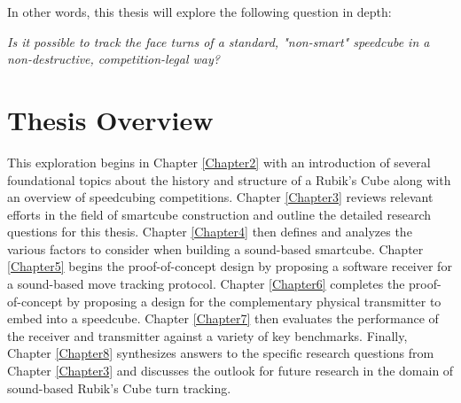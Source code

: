 In other words, this thesis will explore the following question in depth:

\emph{Is it possible to track the face turns of a standard, "non-smart"
speedcube in a non-destructive, competition-legal way?}


\section{Thesis Overview}
\label{sec:thesis-overview}

This exploration begins in Chapter \ref{Chapter2} with an introduction
of several foundational topics about the history and structure of a
Rubik's Cube along with an overview of speedcubing competitions.
Chapter \ref{Chapter3} reviews relevant efforts in the field of
smartcube construction and outline the detailed research questions for
this thesis. Chapter \ref{Chapter4} then defines and analyzes the
various factors to consider when building a sound-based smartcube.
Chapter \ref{Chapter5} begins the proof-of-concept design by proposing
a software receiver for a sound-based move tracking protocol. Chapter
\ref{Chapter6} completes the proof-of-concept by proposing a design for
the complementary physical transmitter to embed into a speedcube.
Chapter \ref{Chapter7} then evaluates the performance of the receiver
and transmitter against a variety of key benchmarks. Finally, Chapter
\ref{Chapter8} synthesizes answers to the specific research questions
from Chapter \ref{Chapter3} and discusses the outlook for future
research in the domain of sound-based Rubik's Cube turn tracking.

